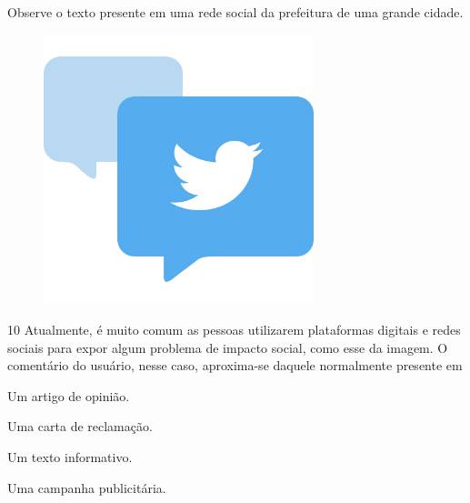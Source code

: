 Observe o texto presente em uma rede social da prefeitura de
uma grande cidade.

\begin{myquote}
\begin{figure}[H]
\centering\includegraphics[width=0.7\textwidth]{./imgSAEB_6_POR/freepik/PORT_6_IMG-13.jpeg}
\end{figure}
\end{myquote}


\num{10} Atualmente, é muito comum as pessoas utilizarem plataformas digitais e
redes sociais para expor algum problema de impacto social, como esse da
imagem. O comentário do usuário, nesse caso, aproxima-se daquele
normalmente presente em

\begin{escolha}
\item Um artigo de opinião.
\item Uma carta de reclamação.
\item Um texto informativo.
\item Uma campanha publicitária.
\end{escolha}


